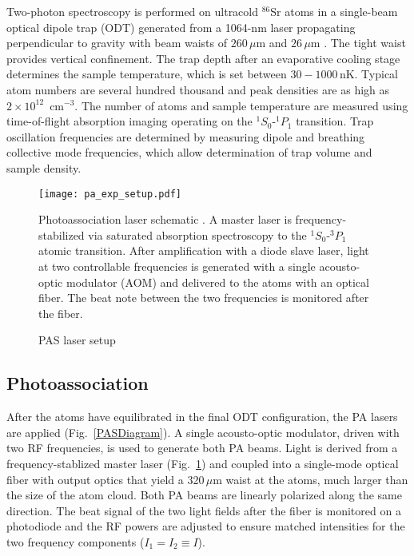 Two-photon spectroscopy is performed on ultracold $^{86}$Sr atoms in a single-beam optical dipole trap (ODT) generated from a 1064-nm laser propagating perpendicular to gravity with beam waists of $260$\,$\mu$m and $26$\,$\mu$m \cite{mmp08,ssk14}. The tight waist provides vertical confinement. The trap depth after an evaporative cooling stage determines the sample temperature, which is set between $30-1000$\,nK. Typical atom numbers are several hundred thousand and peak densities are as high as $2\times 10^{12}$\, cm$^{-3}$. The number of atoms and sample temperature are measured using time-of-flight absorption imaging operating on the $^1S_0$-$^1P_1$ transition. Trap oscillation frequencies are determined by measuring dipole and breathing collective mode frequencies, which allow determination of trap volume and sample density.




\begin{figure} \label{Experimental Setup}
\centerline{
  \texttt{[image: pa\_exp\_setup.pdf]}}
  \caption{PAS laser setup}{Photoassociation laser schematic . A master laser is frequency-stabilized via saturated absorption spectroscopy to the $^1S_0$-$^3P_1$ atomic transition. After amplification with a diode slave laser, light at two controllable frequencies is generated with a single acousto-optic modulator (AOM) and delivered to the atoms with an optical fiber. The beat note between the two frequencies is monitored after the fiber.}  
\end{figure}


\subsection{Photoassociation}

After the atoms have equilibrated in the final ODT configuration, the PA lasers are applied (Fig.\ \ref{PASDiagram}). A single acousto-optic modulator, driven with two RF frequencies, is used to generate both PA beams. Light is derived from a frequency-stablized master laser (Fig.\ \ref{Experimental Setup}) and coupled into a single-mode optical fiber with output optics that yield a 320\,$\mu$m waist at the atoms, much larger than the size of the atom cloud. Both PA beams are linearly polarized along the same direction. The beat signal of the two light fields after the fiber is monitored on a photodiode and the RF powers are adjusted to ensure matched intensities for the two frequency components ($I_1=I_2\equiv I$).

